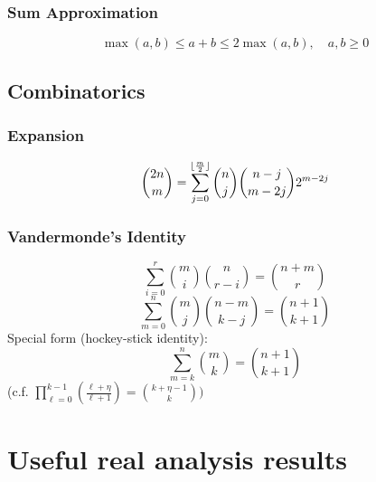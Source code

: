 \documentclass[10pt]{article}
\begin{document}
\subsubsection{Sum Approximation}
\begin{equation}
    \max(a,b) \leq a+b \leq 2 \max(a,b), \quad a,b \geq 0 
\end{equation}

\subsection{Combinatorics}
\subsubsection{Expansion}
\begin{equation}
    \binom{2n}{m} = \sum_{j=0}^{\lfloor \frac{m}{2} \rfloor} \binom{n}{j} \binom{n-j}{m-2j} 2^{m-2j}
\end{equation}

\subsubsection{Vandermonde's Identity}
\begin{equation}
    \sum_{i=0}^r \binom{m}{i} \binom{n}{r-i} = \binom{n+m}{r}
\end{equation}
\begin{equation}
    \sum_{m=0}^n \binom{m}{j} \binom{n-m}{k-j} = \binom{n+1}{k+1} 
\end{equation}
Special form (\alert{hockey-stick identity}):
\begin{equation}
    \sum_{m=k}^n \binom{m}{k} = \binom{n+1}{k+1}
\end{equation}
(c.f. $\prod_{\ell=0}^{k-1} \left( \frac{\ell + \eta}{\ell +1} \right) = {k + \eta -1 \choose k})$

\section{Useful real analysis results}
\end{document}
